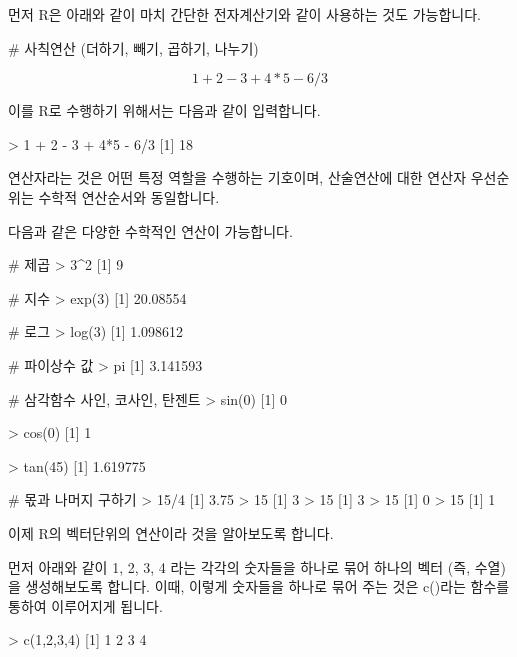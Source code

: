 먼저 R은 아래와 같이 마치 간단한 전자계산기와 같이 사용하는 것도 가능합니다.

\begin{Schunk}
	\begin{Soutput}
# 사칙연산 (더하기, 빼기, 곱하기, 나누기)
	\end{Soutput}
\end{Schunk}

\begin{equation}
1 + 2 - 3 + 4*5 - 6/3
\end{equation}

이를 R로 수행하기 위해서는 다음과 같이 입력합니다. 

\begin{Schunk}
	\begin{Soutput}
> 1 + 2 - 3 + 4*5 - 6/3
[1] 18
	\end{Soutput}
\end{Schunk}

연산자라는 것은 어떤 특정 역할을 수행하는 기호이며, 산술연산에 대한  연산자 우선순위는 수학적 연산순서와 동일합니다. 

다음과 같은 다양한 수학적인 연산이 가능합니다. 

\begin{Schunk}
	\begin{Soutput}
# 제곱 
> 3^2
[1] 9

# 지수 
> exp(3)
[1] 20.08554
 
# 로그 
> log(3)
[1] 1.098612
 
# 파이상수 값 
> pi
[1] 3.141593

# 삼각함수 사인, 코사인, 탄젠트  
> sin(0)
[1] 0

> cos(0)
[1] 1

> tan(45)
[1] 1.619775
 
# 몫과 나머지 구하기 
> 15/4
[1] 3.75
> 15 %/% 4
[1] 3
> 15 %% 4
[1] 3
> 15 %% 3
[1] 0
> 15 %% 2
[1] 1
 
\end{Soutput}
\end{Schunk}

이제 R의 벡터단위의 연산이라 것을 알아보도록 합니다. 

먼저 아래와 같이 1, 2, 3, 4 라는 각각의 숫자들을 하나로 묶어 하나의 벡터 (즉, 수열)을 생성해보도록 합니다. 
이때, 이렇게 숫자들을 하나로 묶어 주는 것은 c()라는 함수를 통하여 이루어지게 됩니다.

\begin{Schunk}
\begin{Soutput}
> c(1,2,3,4)
[1] 1 2 3 4
\end{Soutput}
\end{Schunk}

